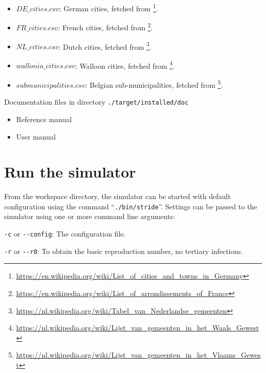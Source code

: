 \begin{compactitem}
\begin{itemize}
        \item $DE\_cities.csv$: German cities, fetched from \footnote{\url{https://en.wikipedia.org/wiki/List\_of\_cities\_and\_towns\_in\_Germany}}.
        \item $FR\_cities.csv$: French cities, fetched from \footnote{\url{https://en.wikipedia.org/wiki/List\_of\_arrondissements\_of\_France}}.
        \item $NL\_cities.csv$: Dutch cities, fetched from \footnote{\url{https://nl.wikipedia.org/wiki/Tabel\_van\_Nederlandse\_gemeenten}}.
        \item $wallonia\_cities.csv$: Walloon cities, fetched from \footnote{\url{https://nl.wikipedia.org/wiki/Lijst\_van\_gemeenten\_in\_het\_Waals\_Gewest}}.
        \item $submunicipalities.csv$: Belgian sub-municipalities, fetched from \footnote{\url{https://nl.wikipedia.org/wiki/Lijst\_van\_gemeenten\_in\_het\_Vlaams\_Gewest}}.
        \end{itemize}
    \item Documentation files
      	in directory \texttt{./target/installed/doc}
      	\begin{itemize}
        		\item Reference manual
        		\item User manual
        \end{itemize}
\end{compactitem}



\section{Run the simulator}


From the workspace directory, the simulator can be started with default configuration using the command \mbox{``\texttt{./bin/stride}''}. Settings can be passed to the simulator using one or more command line arguments:

\begin{compactitem}

\item \texttt{-c} or \texttt{{-}-config}: The configuration file.

\item \texttt{-r} or \texttt{{-}-r0}: To obtain the basic reproduction number, no tertiary infections.

\end{compactitem}

